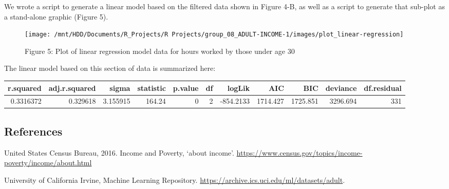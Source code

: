 \documentclass[]{article}
\begin{document}
We wrote a script to generate a linear model based on the filtered data
shown in Figure 4-B, as well as a script to generate that sub-plot as a
stand-alone graphic (Figure 5).

\begin{figure}

{\centering \texttt{[image: /mnt/HDD/Documents/R\_Projects/R Projects/group\_08\_ADULT-INCOME-1/images/plot\_linear-regression]} 

}

\caption{Figure 5: Plot of linear regression model data for hours worked by those under age 30}\label{fig:linear-regression-plot}
\end{figure}

The linear model based on this section of data is summarized here:

\begin{longtable}[]{@{}rrrrrrrrrrr@{}}
\toprule
r.squared & adj.r.squared & sigma & statistic & p.value & df & logLik &
AIC & BIC & deviance & df.residual\tabularnewline
\midrule
\endhead
0.3316372 & 0.329618 & 3.155915 & 164.24 & 0 & 2 & -854.2133 & 1714.427
& 1725.851 & 3296.694 & 331\tabularnewline
\bottomrule
\end{longtable}

\hypertarget{references}{%
\subsection{References}\label{references}}

United States Census Bureau, 2016. Income and Poverty, `about income'.
\url{https://www.census.gov/topics/income-poverty/income/about.html}

University of California Irvine, Machine Learning Repository.
\url{https://archive.ics.uci.edu/ml/datasets/adult}.
\end{document}
